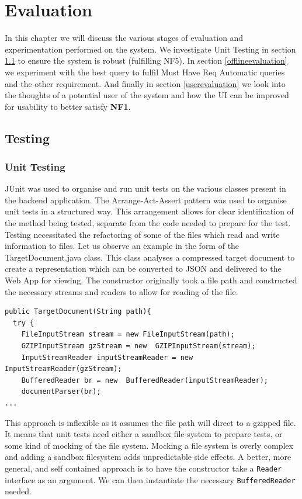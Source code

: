 \documentclass{l4proj}
\newcommand{\code}[1]{\texttt{#1}}
\begin{document}
\chapter{Evaluation} \label{evaluation}
In this chapter we will discuss the various stages of evaluation and experimentation performed on the system.
We investigate Unit Testing in section \ref{testing} to ensure the system is robust (fulfilling NF5).
In section \ref{offlineevaluation} we experiment with the best query to fulfil Must Have Req Automatic queries  and the other requirement.
And finally in section \ref{userevaluation} we look into the thoughts of a potential user of the system and how the UI can be improved for usability to better satisfy \textbf{NF1}.
\section{Testing} \label{testing}
\subsection{Unit Testing}
JUnit was used to organise and run unit tests on the various classes present in the backend application.
The Arrange-Act-Assert pattern was used to organise unit tests in a structured way. This arrangement allows for clear identification of the method being tested, separate from the code needed to prepare for the test.
Testing necessitated the refactoring of some of the files which read and write information to files. Let us observe an example in the form of the TargetDocument.java class. This class analyses a compressed target document to create a representation which can be converted to JSON and delivered to the Web App for viewing.
The constructor originally took a file path and constructed the necessary streams and readers to allow for reading of the file.
\begin{verbatim}
public TargetDocument(String path){
  try {
    FileInputStream stream = new FileInputStream(path);
    GZIPInputStream gzStream = new  GZIPInputStream(stream);
    InputStreamReader inputStreamReader = new  InputStreamReader(gzStream);
    BufferedReader br = new  BufferedReader(inputStreamReader);
    documentParser(br);
...
\end{verbatim}

This approach is inflexible as it assumes the file path will direct to a gzipped file. It means that unit tests need either a sandbox file system to prepare tests, or some kind of mocking of the file system. Mocking a file system is overly complex and adding a sandbox filesystem adds unpredictable side effects.
A better, more general, and self contained approach is to have the constructor take a \code{Reader} interface as an argument. We can then instantiate the necessary \code{BufferedReader} needed.
\end{document}
